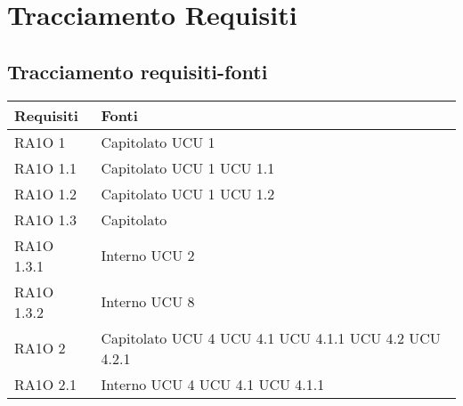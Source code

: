 \clearpage
\section{Tracciamento Requisiti}
\subsection{Tracciamento requisiti-fonti}
			\begin{center}
			\bgroup
			\def\arraystretch{1.8}
			\begin{longtable}{ | p{5cm} | p{5cm} |}
		
			\cellcolor[gray]{0.9} \textbf{Requisiti} & \cellcolor[gray]{0.9} \textbf{Fonti} \\ \hline       
				RA1O 1 &  Capitolato \newline  UCU 1 \newline  \\ \hline      
				RA1O 1.1 &  Capitolato \newline  UCU 1 \newline  UCU 1.1 \newline  \\ \hline      
				RA1O 1.2 &  Capitolato \newline  UCU 1 \newline  UCU 1.2 \newline  \\ \hline      
				RA1O 1.3 &  Capitolato \newline  \\ \hline      
				RA1O 1.3.1 &  Interno \newline  UCU 2 \newline  \\ \hline      
				RA1O 1.3.2 &  Interno \newline  UCU 8 \newline  \\ \hline      
				RA1O 2 &  Capitolato \newline  UCU 4 \newline  UCU 4.1 \newline  UCU 4.1.1 \newline  UCU 4.2 \newline  UCU 4.2.1 \newline  \\ \hline      
				RA1O 2.1 &  Interno \newline  UCU 4 \newline  UCU 4.1 \newline  UCU 4.1.1 \newline  \\ \hline      

\end{longtable}
\end{center}
